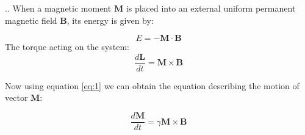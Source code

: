 \documentclass[handout]{beamer}
\begin{document}
\begin{frame}{\thesection.\thesubsection. \insertsubsection}
 When a magnetic moment $\bm{M}$ is placed into an external uniform permanent magnetic field $\bm{B}$, its energy is given by:
			
			\begin{equation} \label{eq:classic_energy}
			E = -\bm{M} \cdot \bm{B}
			\end{equation} 
	\onslide<2->  The torque acting on the system:
			\begin{equation}
			\frac{d\bm{L}}{dt} = \bm{M} \times \bm{B}
			\end{equation}
			  
		Now using equation \ref{eq:1} we can obtain the equation describing the motion of vector $\bm{M}$:
			
			\begin{equation} \label{eq:precession_compact}
			\frac{d\bm{M}}{dt} = \gamma \bm{M} \times \bm{B}
			\end{equation}
			

\end{frame}
\end{document}
